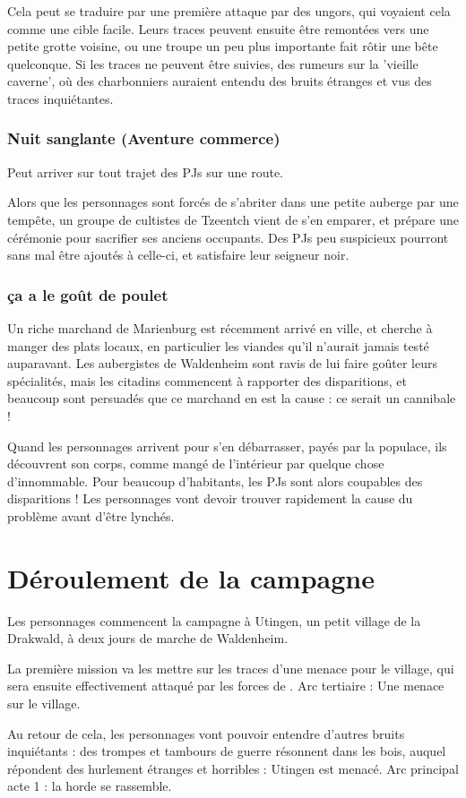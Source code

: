 \documentclass[10pt,a4paper]{book}
\begin{document}
Cela peut se traduire par une première attaque par des ungors, qui voyaient cela comme une cible facile. Leurs traces peuvent ensuite être remontées vers une petite grotte voisine, ou une troupe un peu plus importante fait rôtir une bête quelconque. Si les traces ne peuvent être suivies, des rumeurs sur la 'vieille caverne', où des charbonniers auraient entendu des bruits étranges et vus des traces inquiétantes.
\subsection{Nuit sanglante (Aventure commerce)}
Peut arriver sur tout trajet des PJs sur une route.

Alors que les personnages sont forcés de s'abriter dans une petite auberge par une tempête, un groupe de cultistes de Tzeentch vient de s'en emparer, et prépare une cérémonie pour sacrifier ses anciens occupants. Des PJs peu suspicieux pourront sans mal être ajoutés à celle-ci, et satisfaire leur seigneur noir.
\subsection{ça a le goût de poulet}
Un riche marchand de Marienburg est récemment arrivé en ville, et cherche à manger des plats locaux, en particulier les viandes qu'il n'aurait jamais testé auparavant. Les aubergistes de Waldenheim sont ravis de lui faire goûter leurs spécialités, mais les citadins commencent à rapporter des disparitions, et beaucoup sont persuadés que ce marchand en est la cause : ce serait un cannibale !

Quand les personnages arrivent pour s'en débarrasser, payés par la populace, ils découvrent son corps, comme mangé de l'intérieur par quelque chose d'innommable. Pour beaucoup d'habitants, les PJs sont alors coupables des disparitions ! Les personnages vont devoir trouver rapidement la cause du problème avant d'être lynchés.
\chapter{Déroulement de la campagne}
Les personnages commencent la campagne à Utingen, un petit village de la Drakwald, à deux jours de marche de Waldenheim. 

La première mission va les mettre sur les traces d'une menace pour le village, qui sera ensuite effectivement attaqué par les forces de \nomadversaire. Arc tertiaire : Une menace sur le village. 

Au retour de cela, les personnages vont pouvoir entendre d'autres bruits inquiétants : des trompes et tambours de guerre résonnent dans les bois, auquel répondent des hurlement étranges et horribles : Utingen est menacé. Arc principal acte 1 : la horde se rassemble.
\end{document}
